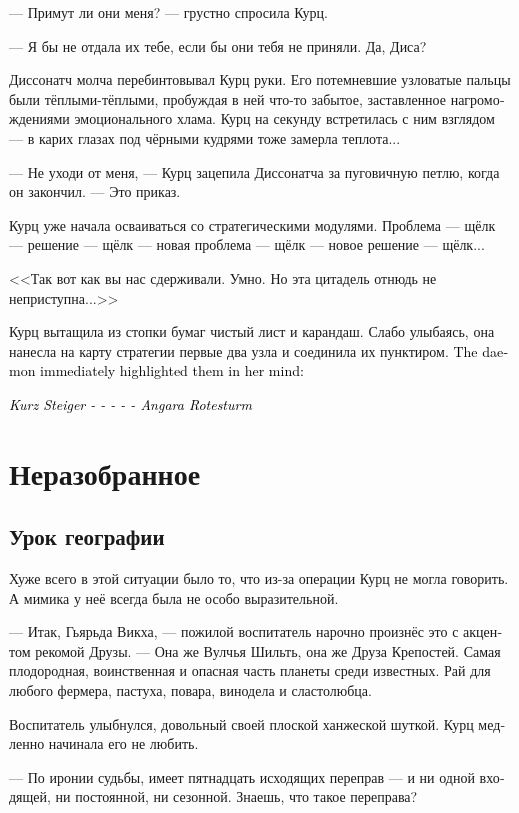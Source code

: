 \documentclass[a4paper,12pt,fleqn]{book}\usepackage{cooltooltips}\usepackage{polyglossia}\setdefaultlanguage[babelshorthands=true]{russian}\setotherlanguage{english}\defaultfontfeatures{Ligatures=TeX,Mapping=tex-text} \usepackage{xcolor}\definecolor{lightgray}{HTML}{bbbbbb}\color{lightgray}\newcommand{\ml}[3]{\textenglish{\textcolor{black}{#3}}}
\newcommand{\asterism}{\vspace{1em}{\centering\Large\bfseries$\ast~\ast~\ast$\par}\vspace{1em}}
\begin{document}
--- Примут ли они меня? --- грустно спросила Курц.

--- Я бы не отдала их тебе, если бы они тебя не приняли.
Да, Диса?

Диссонатч молча перебинтовывал Курц руки.
Его потемневшие узловатые пальцы были тёплыми-тёплыми, пробуждая в ней что-то забытое, заставленное нагромождениями эмоционального хлама.
Курц на секунду встретилась с ним взглядом --- в карих глазах под чёрными кудрями тоже замерла теплота...

--- Не уходи от меня, --- Курц зацепила Диссонатча за пуговичную петлю, когда он закончил.
--- Это приказ.

\asterism

Курц уже начала осваиваться со стратегическими модулями.
Проблема --- щёлк --- решение --- щёлк --- новая проблема --- щёлк --- новое решение --- щёлк...

<<Так вот как вы нас сдерживали.
Умно.
Но эта цитадель отнюдь не неприступна...>>

Курц вытащила из стопки бумаг чистый лист и карандаш.
Слабо улыбаясь, она нанесла на карту стратегии первые два узла и соединила их пунктиром.
\ml{$0$}
{Демон тут же подсветил их в её сознании:}
{The daemon immediately highlighted them in her mind:}

\ml{$0$}
{<<Курц Штайгер - - - - - Ангара Ротештурм>>}
{\textit{Kurz Steiger - - - - - Angara Rotesturm}}

\chapter{Неразобранное}

\section{Урок географии}

Хуже всего в этой ситуации было то, что из-за операции Курц не могла говорить.
А мимика у неё всегда была не особо выразительной.

--- Итак, Гьярьда Викха, --- пожилой воспитатель нарочно произнёс это с акцентом рекомой Друзы.
--- Она же Вулчья Шильть, она же Друза Крепостей.
Самая плодородная, воинственная и опасная часть планеты среди известных.
Рай для любого фермера, пастуха, повара, винодела и сластолюбца.

Воспитатель улыбнулся, довольный своей плоской ханжеской шуткой.
Курц медленно начинала его не любить.

--- По иронии судьбы, имеет пятнадцать исходящих переправ --- и ни одной входящей, ни постоянной, ни сезонной.
Знаешь, что такое переправа?
\end{document}
